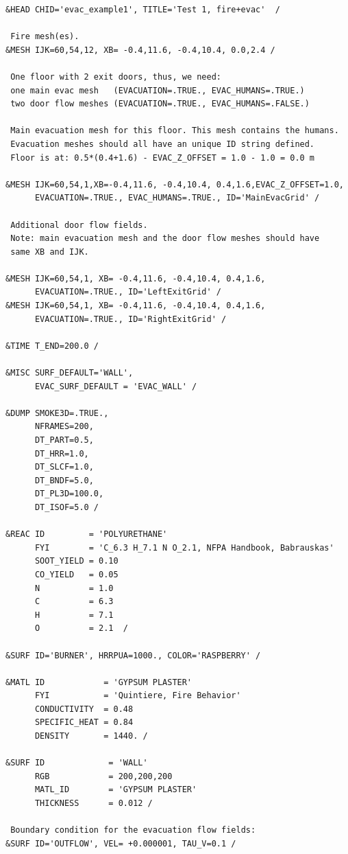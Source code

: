 \documentclass[12pt,a4paper,final,twoside]{stylevk}
\begin{document}
{\fontsize{10}{13}
\selectfont
\begin{verbatim}
&HEAD CHID='evac_example1', TITLE='Test 1, fire+evac'  / 

 Fire mesh(es).
&MESH IJK=60,54,12, XB= -0.4,11.6, -0.4,10.4, 0.0,2.4 /

 One floor with 2 exit doors, thus, we need:
 one main evac mesh   (EVACUATION=.TRUE., EVAC_HUMANS=.TRUE.)
 two door flow meshes (EVACUATION=.TRUE., EVAC_HUMANS=.FALSE.)

 Main evacuation mesh for this floor. This mesh contains the humans.
 Evacuation meshes should all have an unique ID string defined.
 Floor is at: 0.5*(0.4+1.6) - EVAC_Z_OFFSET = 1.0 - 1.0 = 0.0 m

&MESH IJK=60,54,1,XB=-0.4,11.6, -0.4,10.4, 0.4,1.6,EVAC_Z_OFFSET=1.0,
      EVACUATION=.TRUE., EVAC_HUMANS=.TRUE., ID='MainEvacGrid' /

 Additional door flow fields.
 Note: main evacuation mesh and the door flow meshes should have
 same XB and IJK.

&MESH IJK=60,54,1, XB= -0.4,11.6, -0.4,10.4, 0.4,1.6,
      EVACUATION=.TRUE., ID='LeftExitGrid' /
&MESH IJK=60,54,1, XB= -0.4,11.6, -0.4,10.4, 0.4,1.6, 
      EVACUATION=.TRUE., ID='RightExitGrid' /

&TIME T_END=200.0 / 

&MISC SURF_DEFAULT='WALL',
      EVAC_SURF_DEFAULT = 'EVAC_WALL' / 

&DUMP SMOKE3D=.TRUE.,
      NFRAMES=200,
      DT_PART=0.5,
      DT_HRR=1.0,
      DT_SLCF=1.0,
      DT_BNDF=5.0,
      DT_PL3D=100.0,
      DT_ISOF=5.0 /

&REAC ID         = 'POLYURETHANE'
      FYI        = 'C_6.3 H_7.1 N O_2.1, NFPA Handbook, Babrauskas'
      SOOT_YIELD = 0.10
      CO_YIELD   = 0.05
      N          = 1.0
      C          = 6.3
      H          = 7.1
      O          = 2.1  /

&SURF ID='BURNER', HRRPUA=1000., COLOR='RASPBERRY' /

&MATL ID            = 'GYPSUM PLASTER'
      FYI           = 'Quintiere, Fire Behavior'
      CONDUCTIVITY  = 0.48
      SPECIFIC_HEAT = 0.84
      DENSITY       = 1440. /

&SURF ID             = 'WALL'
      RGB            = 200,200,200
      MATL_ID        = 'GYPSUM PLASTER'
      THICKNESS      = 0.012 /

 Boundary condition for the evacuation flow fields:
&SURF ID='OUTFLOW', VEL= +0.000001, TAU_V=0.1 /


\end{verbatim}}
\end{document}
